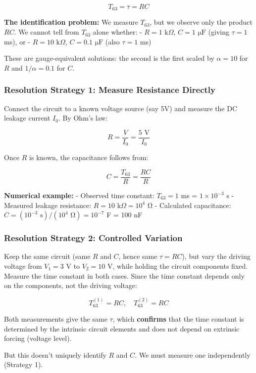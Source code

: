 \documentclass[
]{article}
\begin{document}
\[T_{63} = \tau = RC\]

\textbf{The identification problem:} We measure \(T_{63}\), but we
observe only the product \(RC\). We cannot tell from \(T_{63}\) alone
whether: - \(R = 1\text{ k}\Omega\), \(C = 1\text{ μF}\) (giving
\(\tau = 1\) ms), or - \(R = 10\text{ k}\Omega\), \(C = 0.1\text{ μF}\)
(also \(\tau = 1\) ms)

These are gauge-equivalent solutions: the second is the first scaled by
\(\alpha = 10\) for \(R\) and \(1/\alpha = 0.1\) for \(C\).

\subsubsection{Resolution Strategy 1: Measure Resistance
Directly}\label{resolution-strategy-1-measure-resistance-directly}

Connect the circuit to a known voltage source (say 5V) and measure the
DC leakage current \(I_0\). By Ohm's law:

\[R = \frac{V}{I_0} = \frac{5\text{ V}}{I_0}\]

Once \(R\) is known, the capacitance follows from:

\[C = \frac{T_{63}}{R} = \frac{RC}{R}\]

\textbf{Numerical example:} - Observed time constant: \(T_{63} = 1\) ms
= \(1 \times 10^{-3}\) s - Measured leakage resistance:
\(R = 10\text{ k}\Omega = 10^4\) Ω - Calculated capacitance:
\(C = (10^{-3} \text{ s}) / (10^4 \text{ Ω}) = 10^{-7}\) F = 100 nF

\subsubsection{Resolution Strategy 2: Controlled
Variation}\label{resolution-strategy-2-controlled-variation}

Keep the same circuit (same \(R\) and \(C\), hence same \(\tau = RC\)),
but vary the driving voltage from \(V_1 = 3\) V to \(V_2 = 10\) V, while
holding the circuit components fixed. Measure the time constant in both
cases. Since the time constant depends only on the components, not the
driving voltage:

\[T_{63}^{(1)} = RC, \quad T_{63}^{(2)} = RC\]

Both measurements give the same \(\tau\), which \textbf{confirms} that
the time constant is determined by the intrinsic circuit elements and
does not depend on extrinsic forcing (voltage level).

But this doesn't uniquely identify \(R\) and \(C\). We must measure one
independently (Strategy 1).
\end{document}
